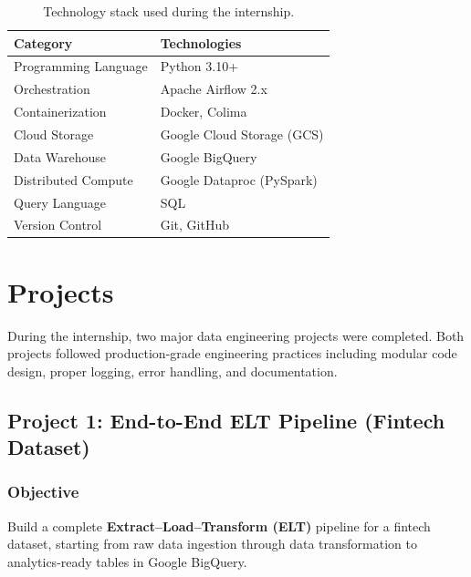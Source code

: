 \documentclass[12pt, a4paper]{article}
\begin{document}
\begin{table}[h!]
    \centering
    \caption{Technology stack used during the internship.}
    \begin{tabular}{ll}
        \toprule
        \textbf{Category} & \textbf{Technologies} \\
        \midrule
        Programming Language & Python 3.10+ \\
        Orchestration        & Apache Airflow 2.x \\
        Containerization     & Docker, Colima \\
        Cloud Storage        & Google Cloud Storage (GCS) \\
        Data Warehouse       & Google BigQuery \\
        Distributed Compute  & Google Dataproc (PySpark) \\
        Query Language       & SQL \\
        Version Control      & Git, GitHub \\
        \bottomrule
    \end{tabular}
    \label{table:tech_stack}
\end{table}

\section{Projects}
\label{sec:projects}

\noindent During the internship, two major data engineering projects were completed. Both projects followed production-grade engineering practices including modular code design, proper logging, error handling, and documentation.

\subsection{Project 1: End-to-End ELT Pipeline (Fintech Dataset)}

\subsubsection{Objective}
\noindent Build a complete \textbf{Extract--Load--Transform (ELT)} pipeline for a fintech dataset, starting from raw data ingestion through data transformation to analytics-ready tables in Google BigQuery.
\end{document}
